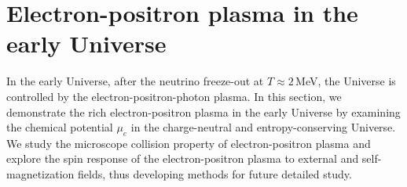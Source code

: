 
\section{ Electron-positron plasma in the early Universe}\label{section_electron}

In the early Universe, after the neutrino freeze-out at $T\approx 2$\,MeV, the Universe is controlled by the electron-positron-photon plasma. In this section, we demonstrate the rich electron-positron plasma in the early Universe by examining the chemical potential $\mu_e$ in the charge-neutral and entropy-conserving Universe. We study the  microscope collision property of electron-positron plasma and explore the spin response of the electron-positron plasma to external and self-magnetization fields, thus developing methods for future detailed study.







